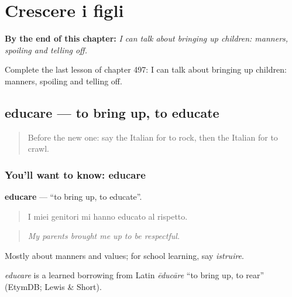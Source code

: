 
\chapter{Crescere i figli}
\label{ch:it-crescere-i-figli}

\begin{chapteropening}
\textbf{By the end of this chapter:} \emph{I can talk about bringing up children: manners, spoiling and telling off.}

Complete the last lesson of chapter 497: I can talk about bringing up children: manners, spoiling and telling off.
\end{chapteropening}

\section[educare]{educare — to bring up, to educate}

\label{lesson:IT-C497-educare}



\begin{quote}
Before the new one: say the Italian for to rock, then the Italian for to crawl.
\end{quote}

\subsection*{You'll want to know: educare}
\textbf{educare} — \textquotedblleft{}to bring up, to educate\textquotedblright{}.

\begin{quote}
I miei genitori mi hanno educato al rispetto.
\end{quote}

\begin{quote}
\emph{My parents brought me up to be respectful.}
\end{quote}

Mostly about manners and values; for school learning, say \emph{istruire}.

\begin{cousinweb}
\emph{educare} is a learned borrowing from Latin \emph{ēducāre} \textquotedblleft{}to bring up, to rear\textquotedblright{} (EtymDB; Lewis \& Short).
\end{cousinweb}

